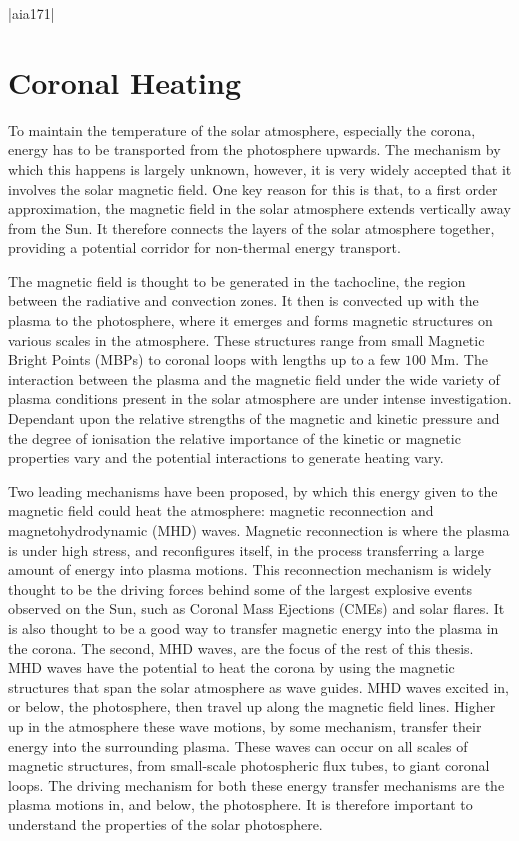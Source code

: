 \py[chapter1]|aia171|


\section{Coronal Heating}

To maintain the temperature of the solar atmosphere, especially the corona, energy has to be transported from the photosphere upwards.
The mechanism by which this happens is largely unknown, however, it is very widely accepted that it involves the solar magnetic field.
One key reason for this is that, to a first order approximation, the magnetic field in the solar atmosphere extends vertically away from the Sun.
It therefore connects the layers of the solar atmosphere together, providing a potential corridor for non-thermal energy transport.

The magnetic field is thought to be generated in the tachocline, the region between the radiative and convection zones.
It then is convected up with the plasma to the photosphere, where it emerges and forms magnetic structures on various scales in the atmosphere.
These structures range from small Magnetic Bright Points (MBPs) to coronal loops with lengths up to a few $100$ Mm.
The interaction between the plasma and the magnetic field under the wide variety of plasma conditions present in the solar atmosphere are under intense investigation.
Dependant upon the relative strengths of the magnetic and kinetic pressure and the degree of ionisation the relative importance of the kinetic or magnetic properties vary and the potential interactions to generate heating vary.

Two leading mechanisms have been proposed, by which this energy given to the magnetic field could heat the atmosphere: magnetic reconnection and magnetohydrodynamic (MHD) waves.
Magnetic reconnection is where the plasma is under high stress, and reconfigures itself, in the process transferring a large amount of energy into plasma motions.
This reconnection mechanism is widely thought to be the driving forces behind some of the largest explosive events observed on the Sun, such as Coronal Mass Ejections (CMEs) and solar flares.
It is also thought to be a good way to transfer magnetic energy into the plasma in the corona.
The second, MHD waves, are the focus of the rest of this thesis.
MHD waves have the potential to heat the corona by using the magnetic structures that span the solar atmosphere as wave guides.
MHD waves excited in, or below, the photosphere, then travel up along the magnetic field lines.
Higher up in the atmosphere these wave motions, by some mechanism, transfer their energy into the surrounding plasma.
These waves can occur on all scales of magnetic structures, from small-scale photospheric flux tubes, to giant coronal loops.
The driving mechanism for both these energy transfer mechanisms are the plasma motions in, and below, the photosphere.
It is therefore important to understand the properties of the solar photosphere.

